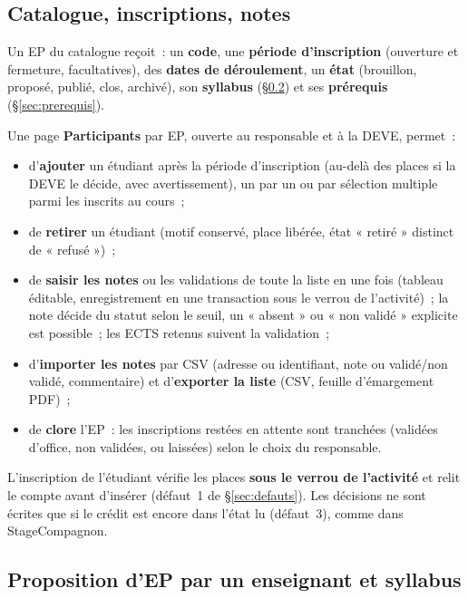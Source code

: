 \documentclass[11pt,a4paper]{article}
\newcommand{\code}[1]{\texttt{\detokenize{#1}}}
\begin{document}
\subsection{Catalogue, inscriptions, notes}\label{sec:catalogue}

Un EP du catalogue reçoit~: un \textbf{code}, une \textbf{période d'inscription}
(ouverture et fermeture, facultatives), des \textbf{dates de déroulement}, un
\textbf{état} (brouillon, proposé, publié, clos, archivé), son \textbf{syllabus}
(§\ref{sec:syllabus}) et ses \textbf{prérequis} (§\ref{sec:prerequis}).

Une page \textbf{Participants} par EP, ouverte au responsable et à la DEVE, permet~:
\begin{itemize}
  \item d'\textbf{ajouter} un étudiant après la période d'inscription (au-delà des places
    si la DEVE le décide, avec avertissement), un par un ou par sélection multiple parmi les
    inscrits au cours~;
  \item de \textbf{retirer} un étudiant (motif conservé, place libérée, état « retiré »
    distinct de « refusé »)~;
  \item de \textbf{saisir les notes} ou les validations de toute la liste en une fois
    (tableau éditable, enregistrement en une transaction sous le verrou de l'activité)~; la
    note décide du statut selon le seuil, un « absent » ou « non validé » explicite est
    possible~; les ECTS retenus suivent la validation~;
  \item d'\textbf{importer les notes} par CSV (adresse ou identifiant, note ou
    validé/non validé, commentaire) et d'\textbf{exporter la liste} (CSV, feuille
    d'émargement PDF)~;
  \item de \textbf{clore} l'EP~: les inscriptions restées en attente sont tranchées
    (validées d'office, non validées, ou laissées) selon le choix du responsable.
\end{itemize}
L'inscription de l'étudiant vérifie les places \textbf{sous le verrou de l'activité} et
relit le compte avant d'insérer (défaut~1 de §\ref{sec:defauts}). Les décisions ne sont
écrites que si le crédit est encore dans l'état lu (défaut~3), comme
\code{stage_update_entry_if()} dans StageCompagnon.

\subsection{Proposition d'EP par un enseignant et syllabus}\label{sec:syllabus}
\end{document}
